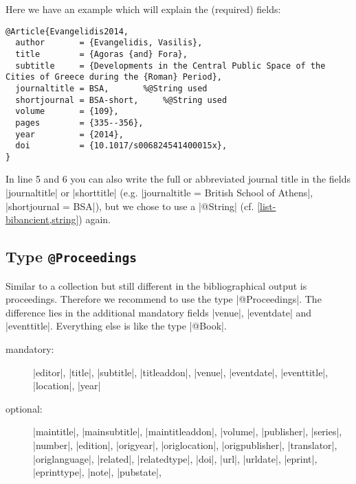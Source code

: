 \documentclass[a4paper,
10pt,
greek,
french,
spanish,
italian,
ngerman,
english
]{ltxdoc}
\begin{document}
Here we have an example which will explain the (required)  fields:
\begin{lstlisting}[style=bibentry,label=Evangelidis2014,caption={{@}Article\{Evangelidis2014,…\} }]
@Article{Evangelidis2014,
  author       = {Evangelidis, Vasilis},
  title        = {Agoras {and} Fora},
  subtitle     = {Developments in the Central Public Space of the Cities of Greece during the {Roman} Period},
  journaltitle = BSA,		%@String used
  shortjournal = BSA-short,		%@String used
  volume       = {109},
  pages        = {335--356},
  year         = {2014},
  doi          = {10.1017/s006824541400015x},
}
\end{lstlisting}
In line 5 and 6 you can also write the full or abbreviated journal title in the fields |journaltitle| or |shorttitle| (e.g. |journaltitle = {British School of Athens}|, |shortjournal = {BSA}|), but we chose to use a |@String| (cf. \cref{list-bibancient,string}) again.




\subsection{Type \texttt{@Proceedings}}\label{proceedings}
Similar to a collection but still different in the bibliographical output is proceedings.
Therefore we recommend to use the type |@Proceedings|.
The difference lies in the additional mandatory fields |venue|, |eventdate| and |eventtitle|. Everything else is like the type |@Book|.

\begin{description}
\item[mandatory:] 
|editor|, 
|title|, |subtitle|, |titleaddon|,
|venue|, |eventdate|, |eventtitle|,
|location|, |year|
\item[optional:]
|maintitle|, |mainsubtitle|, |maintitleaddon|, |volume|, 
|publisher|, |series|, |number|, |edition|, 
|origyear|, |origlocation|, |origpublisher|, 
|translator|, |origlanguage|,
|related|, |relatedtype|,
|doi|, |url|, |urldate|, |eprint|, |eprinttype|, |note|, |pubstate|, 
 \end{description}
 
\end{document}
